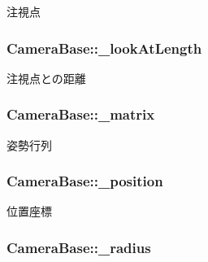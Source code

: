 注視点 

\hypertarget{class_camera_base_a49508fac0dc3362b7e60f614e3f9c669}{
\subsubsection[{\-\_\-look\-At\-Length}]{ Camera\-Base\-::\-\_\-look\-At\-Length\hspace{0.3cm}{\ttfamily [protected]}}}\label{class_camera_base_a49508fac0dc3362b7e60f614e3f9c669}


注視点との距離 

\hypertarget{class_camera_base_ad57a54d46b6005687ee5dfa6a99e2807}{
\subsubsection[{\-\_\-matrix}]{ Camera\-Base\-::\-\_\-matrix\hspace{0.3cm}{\ttfamily [protected]}}}\label{class_camera_base_ad57a54d46b6005687ee5dfa6a99e2807}


姿勢行列 

\hypertarget{class_camera_base_a3452d98af9a9d4323d8a2d3e6dc966e5}{
\subsubsection[{\-\_\-position}]{ Camera\-Base\-::\-\_\-position\hspace{0.3cm}{\ttfamily [protected]}}}\label{class_camera_base_a3452d98af9a9d4323d8a2d3e6dc966e5}


位置座標 

\hypertarget{class_camera_base_a601245a0b3275adcd1f64b518b17a218}{
\subsubsection[{\-\_\-radius}]{ Camera\-Base\-::\-\_\-radius\hspace{0.3cm}{\ttfamily [protected]}}}\label{class_camera_base_a601245a0b3275adcd1f64b518b17a218}


